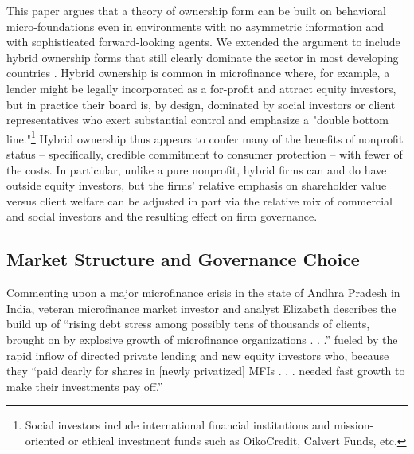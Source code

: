 \documentclass[11pt,english]{article}
\theoremstyle{plain}
\theoremstyle{definition}
\begin{document}
This paper argues that a theory of ownership
form can be built on behavioral micro-foundations even in environments
with no asymmetric information and with sophisticated forward-looking
agents. We extended the  argument to  include  hybrid ownership forms that still clearly dominate the sector in most developing countries
\citep{cull2009,conning2011}. Hybrid ownership is common in microfinance where, for example, a lender might be legally incorporated as a for-profit and attract equity investors, but in practice their board is, by  design, dominated by social investors or client representatives  who  exert substantial
control and emphasize a "double bottom line."\footnote{Social investors include international financial institutions and mission-oriented or ethical investment funds such as OikoCredit,  Calvert Funds, etc.}
Hybrid ownership  thus appears to confer
many of the benefits of nonprofit status -- specifically, credible
commitment to consumer protection -- with fewer of the costs. In particular,
unlike a pure nonprofit, hybrid firms can and do have  outside equity investors, but the firms' relative emphasis on shareholder value versus client welfare can be adjusted in part via the relative mix of commercial and social investors and the resulting effect on firm governance. 
\subsection{Market Structure and Governance Choice}



Commenting upon a major microfinance crisis in the state of Andhra
Pradesh in India, veteran microfinance market investor and analyst
Elizabeth \citet{rhyne2011} describes the build up of ``rising debt
stress among possibly tens of thousands of clients, brought on by
explosive growth of microfinance organizations . . .\textquotedblright{}
fueled by the rapid inflow of directed private lending and new equity
investors who, because they ``paid dearly for shares in {[}newly
privatized{]} MFIs . . . needed fast growth to make their investments
pay off.\textquotedblright{}
\end{document}
